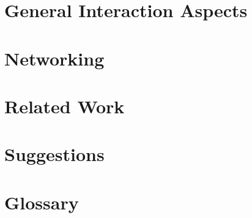 \documentclass{acm_proc_article-sp}
\begin{document}
\section{General Interaction Aspects}

\section{Networking}

\section{Related Work}

\section{Suggestions}

\section{Glossary}



  

\balancecolumns
\end{document}

